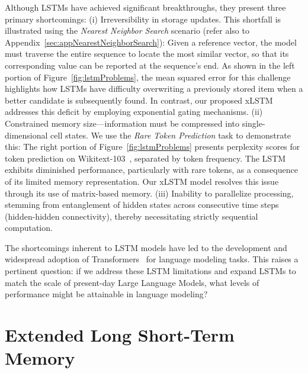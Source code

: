 Although LSTMs have achieved significant breakthroughs, they present three primary shortcomings: (i) Irreversibility in storage updates. This shortfall is illustrated using the {\it Nearest Neighbor Search} scenario (refer also to Appendix~\ref{sec:appNearestNeighborSearch}): Given a reference vector, the model must traverse the entire sequence to locate the most similar vector, so that its corresponding value can be reported at the sequence’s end. As shown in the left portion of Figure~\ref{fig:lstmProblems}, the mean squared error for this challenge highlights how LSTMs have difficulty overwriting a previously stored item when a better candidate is subsequently found. In contrast, our proposed xLSTM addresses this deficit by employing exponential gating mechanisms. (ii) Constrained memory size—information must be compressed into single-dimensional cell states. We use the {\it Rare Token Prediction} task to demonstrate this: The right portion of Figure~\ref{fig:lstmProblems} presents perplexity scores for token prediction on Wikitext-103~\citep{Merity:17}, separated by token frequency. The LSTM exhibits diminished performance, particularly with rare tokens, as a consequence of its limited memory representation. Our xLSTM model resolves this issue through its use of matrix-based memory. (iii) Inability to parallelize processing, stemming from entanglement of hidden states across consecutive time steps (hidden-hidden connectivity), thereby necessitating strictly sequential computation.

The shortcomings inherent to LSTM models have led to the development and widespread adoption of Transformers~\citep{Vaswani:17} for language modeling tasks. This raises a pertinent question: if we address these LSTM limitations and expand LSTMs to match the scale of present-day Large Language Models, what levels of performance might be attainable in language modeling?

\section{Extended Long Short-Term Memory}
\label{sec:xLSTM}

